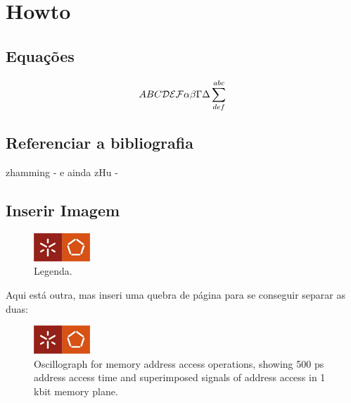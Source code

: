 \chapter[How to?]
{Howto}

\section{Equações}

\begin{equation}
ABC {\cal DEF} \alpha\beta\Gamma\Delta\sum^{abc}_{def}
\end{equation}


\section{Referenciar a bibliografia}

zhamming - \cite{hamming} e ainda zHu - \cite{zHu}

\section{Inserir Imagem}

\begin{figure}[H]
\centerline{\includegraphics[width=.5\textwidth]{images/dium}}
\caption{Legenda.}
\end{figure}

\pagebreak

Aqui está outra, mas inseri uma quebra de página para se conseguir separar as duas:

\begin{figure}[H]
\vskip2pt
\centerline{\includegraphics[width=.5\textwidth]{images/dium}}
\caption{Oscillograph for  memory address access operations,
showing 500 ps
address access time and superimposed signals
of address access in 1 kbit
memory plane.}
\end{figure}


